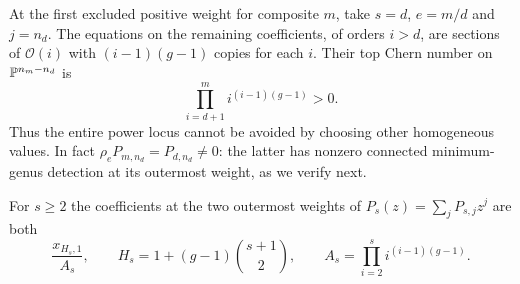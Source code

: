 At the first excluded positive weight for composite $m$, take
$s=d$, $e=m/d$ and $j=n_d$. The equations on the remaining
coefficients, of orders $i>d$, are sections of $\mathcal O(i)$ with
$(i-1)(g-1)$ copies for each $i$. Their top Chern number on
$\mathbb P^{n_m-n_d}$ is
\[
                \prod_{i=d+1}^m i^{(i-1)(g-1)} >0 .
\]
Thus the entire power locus cannot be avoided by choosing other
homogeneous values. In fact $\rho_eP_{m,n_d}=P_{d,n_d}\ne0$:
the latter has nonzero connected minimum-genus detection at its
outermost weight, as we verify next.

\begin{lemma}\label{lem:outer}
For $s\ge2$ the coefficients at the two outermost weights of
$P_s(z)=\sum_jP_{s,j}z^j$ are both
\[
 \frac{x_{H_s,1}}{A_s},\qquad H_s=1+(g-1)\binom{s+1}{2},
 \qquad A_s=\prod_{i=2}^s i^{(i-1)(g-1)} .
\]
\end{lemma}
